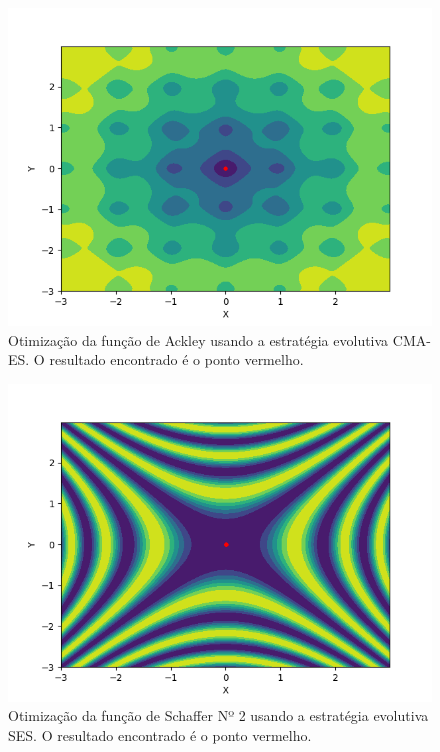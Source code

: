 \documentclass[conference]{IEEEtran}
\begin{document}
\begin{figure}[htbp]
\centering
\centerline{\includegraphics[scale=0.5]{imagens/ackley/cmaes.png}}
\caption{Otimização da função de Ackley usando a estratégia evolutiva CMA-ES. O resultado encontrado é o ponto vermelho.}
\label{ackley/cmaes}
\end{figure}

\begin{figure}[htbp]
\centering
\centerline{\includegraphics[scale=0.5]{imagens/schaffer2d/ses.png}}
\caption{Otimização da função de Schaffer Nº 2 usando a estratégia evolutiva SES. O resultado encontrado é o ponto vermelho.}
\label{schaffer2d/ses}
\end{figure} 
\end{document}
